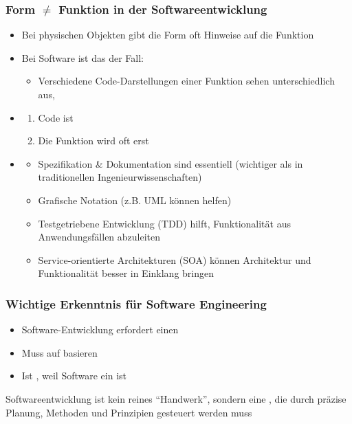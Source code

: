 \subsubsection*{Form $\neq$ Funktion in der Softwareentwicklung}
\begin{itemize}
    \item Bei physischen Objekten gibt die Form oft Hinweise auf die Funktion
    \item Bei Software ist das  der Fall:
    \begin{itemize}
        \item Verschiedene Code-Darstellungen einer Funktion sehen unterschiedlich aus, 
    \end{itemize}
    \item {}
    \begin{enumerate}
        \item Code ist 
        \item Die Funktion wird oft erst 
    \end{enumerate}
    \item {}
    \begin{itemize}
        \item Spezifikation \& Dokumentation sind essentiell (wichtiger als in traditionellen Ingenieurwissenschaften)
        \item Grafische Notation (z.B. UML können helfen)
        \item Testgetriebene Entwicklung (TDD) hilft, Funktionalität aus Anwendungsfällen abzuleiten
        \item Service-orientierte Architekturen (SOA) können Architektur und Funktionalität besser in Einklang bringen
    \end{itemize}
\end{itemize}
\subsubsection*{Wichtige Erkenntnis für Software Engineering}
\begin{itemize}
    \item Software-Entwicklung erfordert einen 
    \item Muss auf  basieren
    \item Ist , weil Software ein  ist
\end{itemize}
 Softwareentwicklung ist kein reines \enquote{Handwerk}, sondern eine , die durch präzise Planung, Methoden und Prinzipien gesteuert werden muss